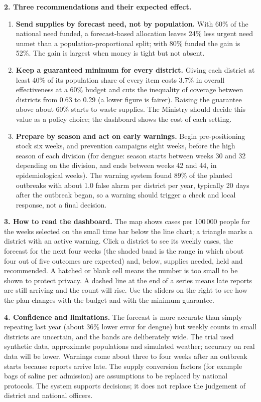\documentclass[conference]{IEEEtran}
\begin{document}
\textbf{2. Three recommendations and their expected effect.}
\begin{enumerate}
\item \textbf{Send supplies by forecast need, not by population.} With 60\% of the national need funded, a forecast-based allocation leaves 24\% less urgent need unmet than a population-proportional split; with 80\% funded the gain is 52\%. The gain is largest when money is tight but not absent.
\item \textbf{Keep a guaranteed minimum for every district.} Giving each district at least 40\% of its population share of every item costs 3.7\% in overall effectiveness at a 60\% budget and cuts the inequality of coverage between districts from 0.63 to 0.29 (a lower figure is fairer). Raising the guarantee above about 60\% starts to waste supplies. The Ministry should decide this value as a policy choice; the dashboard shows the cost of each setting.
\item \textbf{Prepare by season and act on early warnings.} Begin pre-positioning stock six weeks, and prevention campaigns eight weeks, before the high season of each division (for dengue: season starts between weeks 30 and 32 depending on the division, and ends between weeks 42 and 44, in epidemiological weeks). The warning system found 89\% of the planted outbreaks with about 1.0 false alarm per district per year, typically 20 days after the outbreak began, so a warning should trigger a check and local response, not a final decision.
\end{enumerate}

\textbf{3. How to read the dashboard.} The map shows cases per 100\,000 people for the weeks selected on the small time bar below the line chart; a triangle marks a district with an active warning. Click a district to see its weekly cases, the forecast for the next four weeks (the shaded band is the range in which about four out of five outcomes are expected) and, below, supplies needed, held and recommended. A hatched or blank cell means the number is too small to be shown to protect privacy. A dashed line at the end of a series means late reports are still arriving and the count will rise. Use the sliders on the right to see how the plan changes with the budget and with the minimum guarantee.

\textbf{4. Confidence and limitations.} The forecast is more accurate than simply repeating last year (about 36\% lower error for dengue) but weekly counts in small districts are uncertain, and the bands are deliberately wide. The trial used synthetic data, approximate populations and simulated weather; accuracy on real data will be lower. Warnings come about three to four weeks after an outbreak starts because reports arrive late. The supply conversion factors (for example bags of saline per admission) are assumptions to be replaced by national protocols. The system supports decisions; it does not replace the judgement of district and national officers.
\end{document}
